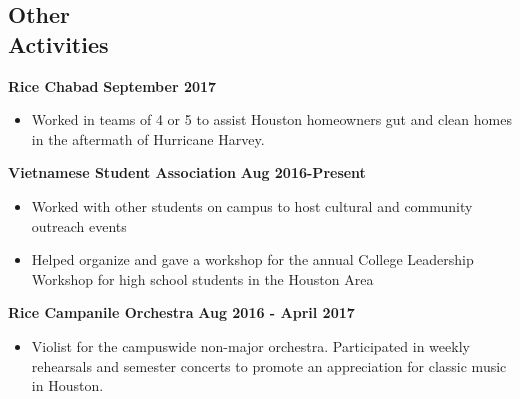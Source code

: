 \documentclass[margin,line]{resume}
\begin{document}
\begin{resume}
\section{\mysidestyle Other\\ Activities}
\textbf{Rice Chabad} \hfill \textbf{September 2017}
\begin{itemize}
    \item Worked in teams of 4 or 5 to assist Houston homeowners gut and clean homes in the aftermath of Hurricane Harvey.
\end{itemize}
\vspace{-3mm}
\textbf{Vietnamese Student Association} \hfill \textbf{Aug 2016-Present}
\begin{itemize}
    \item Worked with other students on campus to host cultural and community outreach events
    \item Helped organize and gave a workshop for the annual College Leadership Workshop for high school students in the Houston Area
\end{itemize}
\vspace{-3mm}
\textbf{Rice Campanile Orchestra} \hfill \textbf{Aug 2016 - April 2017}
\begin{itemize}
    \item Violist for the campuswide non-major orchestra.
        Participated in weekly rehearsals and semester concerts to promote an appreciation for classic music in Houston.
\end{itemize}




\end{resume}
\end{document}
